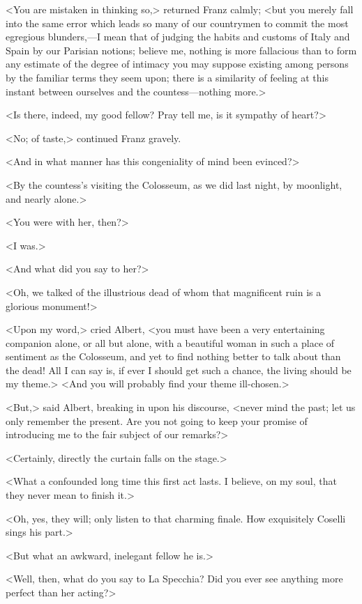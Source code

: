  <You are mistaken in thinking so,> returned Franz calmly; <but you merely fall into the same error which leads so many of our countrymen to commit the most egregious blunders,—I mean that of judging the habits and customs of Italy and Spain by our Parisian notions; believe me, nothing is more fallacious than to form any estimate of the degree of intimacy you may suppose existing among persons by the familiar terms they seem upon; there is a similarity of feeling at this instant between ourselves and the countess—nothing more.> 

 <Is there, indeed, my good fellow? Pray tell me, is it sympathy of heart?> 

 <No; of taste,> continued Franz gravely. 

 <And in what manner has this congeniality of mind been evinced?> 

 <By the countess's visiting the Colosseum, as we did last night, by moonlight, and nearly alone.> 

 <You were with her, then?> 

 <I was.> 

 <And what did you say to her?> 

 <Oh, we talked of the illustrious dead of whom that magnificent ruin is a glorious monument!> 

 <Upon my word,> cried Albert, <you must have been a very entertaining companion alone, or all but alone, with a beautiful woman in such a place of sentiment as the Colosseum, and yet to find nothing better to talk about than the dead! All I can say is, if ever I should get such a chance, the living should be my theme.>  <And you will probably find your theme ill-chosen.> 

 <But,> said Albert, breaking in upon his discourse, <never mind the past; let us only remember the present. Are you not going to keep your promise of introducing me to the fair subject of our remarks?> 

 <Certainly, directly the curtain falls on the stage.> 

 <What a confounded long time this first act lasts. I believe, on my soul, that they never mean to finish it.> 

 <Oh, yes, they will; only listen to that charming finale. How exquisitely Coselli sings his part.> 

 <But what an awkward, inelegant fellow he is.> 

 <Well, then, what do you say to La Specchia? Did you ever see anything more perfect than her acting?> 

